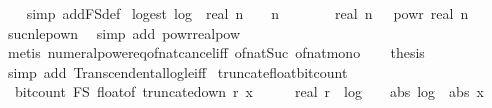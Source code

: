 \begin{isabellebody}
\ \ \isamarkupfalse%
\ {\isacharparenleft}{\kern0pt}simp\ add{\isacharcolon}{\kern0pt}F\isactrlsub S{\isacharunderscore}{\kern0pt}def{\isacharparenright}{\kern0pt}%
\endisatagproof
{\isafoldproof}%
%
\isadelimproof
\isanewline
%
\endisadelimproof
\isanewline
{}\isamarkupfalse%
\ log{\isacharunderscore}{\kern0pt}est{\isacharcolon}{\kern0pt}\ {\isachardoublequoteopen}log\ {}\ {\isacharparenleft}{\kern0pt}real\ n\ {\isacharplus}{\kern0pt}\ {}{\isacharparenright}{\kern0pt}\ {\isasymle}\ n{\isachardoublequoteclose}\isanewline
%
\isadelimproof
%
\endisadelimproof
%
\isatagproof
{}\isamarkupfalse%
\ {\isacharminus}{\kern0pt}\isanewline
\ \ \isamarkupfalse%
\ {\isachardoublequoteopen}{}\ {\isacharplus}{\kern0pt}\ real\ n\ {\isasymle}\ {}\ powr\ {\isacharparenleft}{\kern0pt}real\ n{\isacharparenright}{\kern0pt}{\isachardoublequoteclose}\isanewline
\ \ \ \ \isamarkupfalse%
\ suc{\isacharunderscore}{\kern0pt}n{\isacharunderscore}{\kern0pt}le{\isacharunderscore}{\kern0pt}{}{\isacharunderscore}{\kern0pt}pow{\isacharunderscore}{\kern0pt}n\ \isamarkupfalse%
\ {\isacharparenleft}{\kern0pt}simp\ add{\isacharcolon}{\kern0pt}\ powr{\isacharunderscore}{\kern0pt}realpow{\isacharparenright}{\kern0pt}\isanewline
\ \ \ \ \isamarkupfalse%
\ {\isacharparenleft}{\kern0pt}metis\ numeral{\isacharunderscore}{\kern0pt}power{\isacharunderscore}{\kern0pt}eq{\isacharunderscore}{\kern0pt}of{\isacharunderscore}{\kern0pt}nat{\isacharunderscore}{\kern0pt}cancel{\isacharunderscore}{\kern0pt}iff\ of{\isacharunderscore}{\kern0pt}nat{\isacharunderscore}{\kern0pt}Suc\ of{\isacharunderscore}{\kern0pt}nat{\isacharunderscore}{\kern0pt}mono{\isacharparenright}{\kern0pt}\isanewline
\ \ \isamarkupfalse%
\ {\isacharquery}{\kern0pt}thesis\ \isanewline
\ \ \ \ \isamarkupfalse%
\ {\isacharparenleft}{\kern0pt}simp\ add{\isacharcolon}{\kern0pt}\ Transcendental{\isachardot}{\kern0pt}log{\isacharunderscore}{\kern0pt}le{\isacharunderscore}{\kern0pt}iff{\isacharparenright}{\kern0pt}\isanewline
{}\isamarkupfalse%
%
\endisatagproof
{\isafoldproof}%
%
\isadelimproof
\isanewline
%
\endisadelimproof
\isanewline
{}\isamarkupfalse%
\ truncate{\isacharunderscore}{\kern0pt}float{\isacharunderscore}{\kern0pt}bit{\isacharunderscore}{\kern0pt}count{\isacharcolon}{\kern0pt}\isanewline
\ \ {\isachardoublequoteopen}bit{\isacharunderscore}{\kern0pt}count\ {\isacharparenleft}{\kern0pt}F\isactrlsub S\ {\isacharparenleft}{\kern0pt}float{\isacharunderscore}{\kern0pt}of\ {\isacharparenleft}{\kern0pt}truncate{\isacharunderscore}{\kern0pt}down\ r\ x{\isacharparenright}{\kern0pt}{\isacharparenright}{\kern0pt}{\isacharparenright}{\kern0pt}\ {\isasymle}\ {}\ {\isacharplus}{\kern0pt}\ {}\ {\isacharasterisk}{\kern0pt}\ real\ r\ {\isacharplus}{\kern0pt}\ {}{\isacharasterisk}{\kern0pt}log\ {}\ {\isacharparenleft}{\kern0pt}{}\ {\isacharplus}{\kern0pt}\ abs\ {\isacharparenleft}{\kern0pt}log\ {}\ {\isacharparenleft}{\kern0pt}abs\ x{\isacharparenright}{\kern0pt}{\isacharparenright}{\kern0pt}{\isacharparenright}{\kern0pt}{\isachardoublequoteclose}\ \isanewline

\end{isabellebody}
